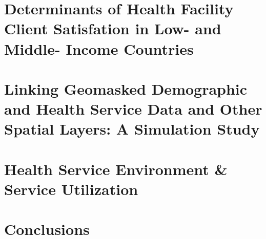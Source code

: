 \documentclass[11pt]{report}
\begin{document}

\chapter{Determinants of Health Facility Client Satisfation in Low- and Middle- Income Countries}
\label{ch:clientSat}



\chapter{Linking Geomasked Demographic and Health Service Data and Other Spatial Layers: A Simulation Study}
\label{ch:simStudy}



\chapter{Health Service Environment \& Service Utilization}
\label{ch:hseUtilization}




\chapter{Conclusions}
  \label{ch:conclusions}

\graphicspath{}


%
%
%
%
%
%
\clearpage

\begin{singlespace}

  \setlength{}

  \raggedright
  \printbibliography[
    heading = none
  ]
\end{singlespace}
\end{document}
